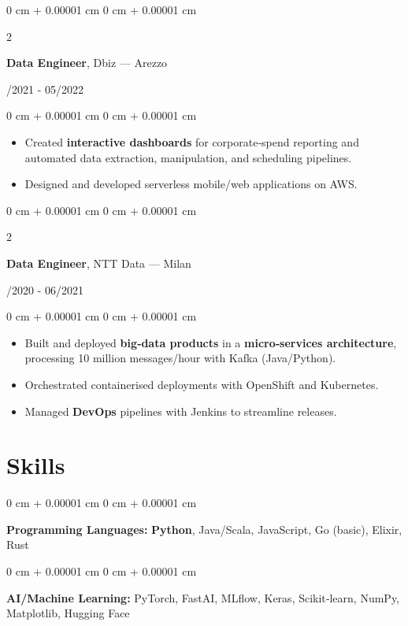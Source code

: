\documentclass[10pt, letterpaper]{article}
\newenvironment{highlights}{
    \begin{itemize}[
        topsep=0.10 cm,
        parsep=0.10 cm,
        partopsep=0pt,
        itemsep=0pt,
        leftmargin=0 cm + 10pt
    ]
}{
    \end{itemize}
} %
\newenvironment{onecolentry}{
    \begin{adjustwidth}{
        0 cm + 0.00001 cm
    }{
        0 cm + 0.00001 cm
    }
}{
    \end{adjustwidth}
} %
\newenvironment{twocolentry}[2][]{
    \onecolentry
    \def\secondColumn{#2}
    \setcolumnwidth{\fill, 4.5 cm}
    \begin{paracol}{2}
}{
    \switchcolumn \raggedleft \secondColumn
    \end{paracol}
    \endonecolentry
} %
\begin{document}
\vspace{0.2 cm}

\begin{twocolentry}{06/2021 - 05/2022}
    \textbf{Data Engineer}, Dbiz — Arezzo
\end{twocolentry}
\begin{onecolentry}
    \begin{highlights}
        \item Created \textbf{interactive dashboards} for corporate‑spend reporting and automated data extraction, manipulation, and scheduling pipelines.
        \item Designed and developed serverless mobile/web applications on AWS.
    \end{highlights}
\end{onecolentry}

\vspace{0.2 cm}

\begin{twocolentry}{06/2020 - 06/2021}
    \textbf{Data Engineer}, NTT Data — Milan
\end{twocolentry}
\begin{onecolentry}
    \begin{highlights}
        \item Built and deployed \textbf{big‑data products} in a \textbf{micro‑services architecture}, processing 10 million messages/hour with Kafka (Java/Python).
        \item Orchestrated containerised deployments with OpenShift and Kubernetes.
        \item Managed \textbf{DevOps} pipelines with Jenkins to streamline releases.
    \end{highlights}
\end{onecolentry}

\section{Skills}

\begin{onecolentry}
    \textbf{Programming Languages:} \textbf{Python}, Java/Scala, JavaScript, Go (basic), Elixir, Rust
\end{onecolentry}

\vspace{0.2 cm}

\begin{onecolentry}
    \textbf{AI/Machine Learning:} PyTorch, FastAI, MLflow, Keras, Scikit‑learn, NumPy, Matplotlib, Hugging Face
\end{onecolentry}
\end{document}
